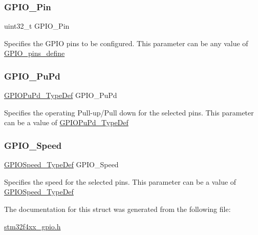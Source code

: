 \subsubsection{\texorpdfstring{G\+P\+I\+O\+\_\+\+Pin}{GPIO\_Pin}}
{\footnotesize\ttfamily uint32\+\_\+t G\+P\+I\+O\+\_\+\+Pin}

Specifies the G\+P\+IO pins to be configured. This parameter can be any value of \mbox{\hyperlink{group___g_p_i_o__pins__define}{G\+P\+I\+O\+\_\+pins\+\_\+define}} \mbox{\label{struct_g_p_i_o___init_type_def_aeb0168ffc465346d21f3120aec320b72}} 
\subsubsection{\texorpdfstring{G\+P\+I\+O\+\_\+\+Pu\+Pd}{GPIO\_PuPd}}
{\footnotesize\ttfamily \mbox{\hyperlink{group___g_p_i_o_gafb7ecd99c44b4fd702d669304a36c2c8}{G\+P\+I\+O\+Pu\+Pd\+\_\+\+Type\+Def}} G\+P\+I\+O\+\_\+\+Pu\+Pd}

Specifies the operating Pull-\/up/\+Pull down for the selected pins. This parameter can be a value of \mbox{\hyperlink{group___g_p_i_o_gafb7ecd99c44b4fd702d669304a36c2c8}{G\+P\+I\+O\+Pu\+Pd\+\_\+\+Type\+Def}} \mbox{\label{struct_g_p_i_o___init_type_def_a57b08335216f50618ebc080e4fbb0a80}} 
\subsubsection{\texorpdfstring{G\+P\+I\+O\+\_\+\+Speed}{GPIO\_Speed}}
{\footnotesize\ttfamily \mbox{\hyperlink{group___g_p_i_o_ga062ad92b67b4a1f301c161022cf3ba8e}{G\+P\+I\+O\+Speed\+\_\+\+Type\+Def}} G\+P\+I\+O\+\_\+\+Speed}

Specifies the speed for the selected pins. This parameter can be a value of \mbox{\hyperlink{group___g_p_i_o_ga062ad92b67b4a1f301c161022cf3ba8e}{G\+P\+I\+O\+Speed\+\_\+\+Type\+Def}} 

The documentation for this struct was generated from the following file\+:\begin{DoxyCompactItemize}
\item 
\mbox{\hyperlink{stm32f4xx__gpio_8h}{stm32f4xx\+\_\+gpio.\+h}}\end{DoxyCompactItemize}
